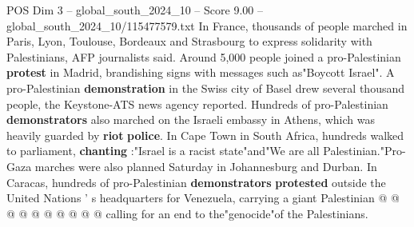\begin{textsample}{POS Dim 3 – global\_south\_2024\_10 – Score 9.00 – global\_south\_2024\_10/115477579.txt}
In France, thousands of people marched in Paris, Lyon, Toulouse, Bordeaux and Strasbourg to express solidarity with Palestinians, AFP journalists said.
Around 5,000 people joined a pro-Palestinian \textbf{protest} in Madrid, brandishing signs with messages such as"Boycott Israel".
A pro-Palestinian \textbf{demonstration} in the Swiss city of Basel drew several thousand people, the Keystone-ATS news agency reported.
Hundreds of pro-Palestinian \textbf{demonstrators} also marched on the Israeli embassy in Athens, which was heavily guarded by \textbf{riot} \textbf{police}.
In Cape Town in South Africa, hundreds walked to parliament, \textbf{chanting} :"Israel is a racist state"and"We are all Palestinian."Pro-Gaza marches were also planned Saturday in Johannesburg and Durban.
In Caracas, hundreds of pro-Palestinian \textbf{demonstrators} \textbf{protested} outside the United Nations ' s headquarters for Venezuela, carrying a giant Palestinian @ @ @ @ @ @ @ @ @ @ calling for an end to the"genocide"of the Palestinians.

\end{textsample}
